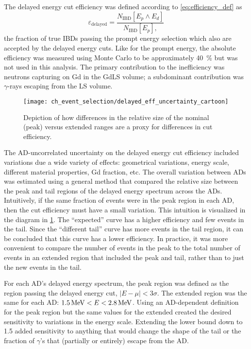 The delayed energy cut efficiency was defined according to \cref{eq:efficiency_def} as
\begin{equation}\label{eq:delayed_eff}
    \varepsilon_\text{delayed} = \frac{N_\text{IBD}[E_p \wedge E_d]}{
        N_\text{IBD}[E_p],
    }
\end{equation}
the fraction of true IBDs passing the prompt energy selection
which also are accepted by the delayed energy cuts.
Like for the prompt energy, the absolute efficiency
was measured using Monte Carlo to be approximately \SI{40}{\percent}
but was not used in this analysis.
The primary contribution to the inefficiency
was neutrons capturing on Gd in the GdLS volume;
a subdominant contribution was $\gamma$-rays escaping from the LS volume.

\begin{figure}
    \centering
    \texttt{[image: ch\_event\_selection/delayed\_eff\_uncertainty\_cartoon]}
    \caption[Delayed energy efficiency diagram]{
        Depiction of how differences in the relative size
        of the nominal (peak) versus extended ranges
        are a proxy for differences in cut efficiency.
    }
    \label{fig:delayed_eff_unc_cartoon}
\end{figure}

The AD-uncorrelated uncertainty on the delayed energy cut efficiency
included variations due a wide variety of effects:
geometrical variations, energy scale, different material properties,
Gd fraction, etc.
The overall variation between ADs was estimated using a general method
that compared the relative size between the peak and tail regions
of the delayed energy spectrum across the ADs.
Intuitively, if the same fraction of events were in the peak region in each AD,
then the cut efficiency must have a small variation.
This intuition is visualized in the diagram in \cref{fig:delayed_eff_unc_cartoon}.
The ``expected'' curve has a higher efficiency
and few events in the tail.
Since the ``different tail'' curve has more events in the tail region,
it can be concluded that this curve has a lower efficiency.
In practice, it was more convenient to compare the number of events in the peak
to the total number of events in an extended region that included the peak and tail,
rather than to just the new events in the tail.

For each AD's delayed energy spectrum, the peak region was defined as
the region passing the delayed energy cut, $\vert E-\mu \vert < 3\sigma$.
The extended region was the same for each AD:
$\SI{1.5}{\mega\electronvolt} < E < \SI{2.8}{\mega\electronvolt}$.
Using an AD-dependent definition for the peak region but
the same values for the extended created
the desired sensitivity to variations in the energy scale.
Extending the lower bound down to \SI{1.5}{\mev} added sensitivity to
anything that would change the shape of the tail
or the fraction of $\gamma$'s that (partially or entirely) escape from the AD.

